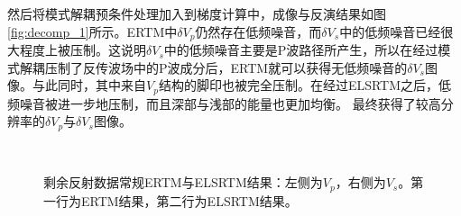 然后将模式解耦预条件处理加入到梯度计算中，成像与反演结果如图\ref{fig:decomp_1}所示。ERTM中$\delta
V_p$仍然存在低频噪音，而$\delta
V_s$中的低频噪音已经很大程度上被压制。这说明$\delta
V_s$中的低频噪音主要是P波路径所产生，所以在经过模式解耦压制了反传波场中的P波成分后，ERTM就可以获得无低频噪音的$\delta
V_s$图像。与此同时，其中来自$V_p$结构的脚印也被完全压制。在经过ELSRTM之后，低频噪音被进一步地压制，而且深部与浅部的能量也更加均衡。
最终获得了较高分辨率的$\delta V_p$与$\delta V_s$图像。
\begin{figure}[!htb]
   \centering
   \\
   \caption{剩余反射数据常规ERTM与ELSRTM结果：左侧为$V_p$，右侧为$V_s$。第一行为ERTM结果，第二行为ELSRTM结果。}
   \label{fig:node_1_refl}
\end{figure}

